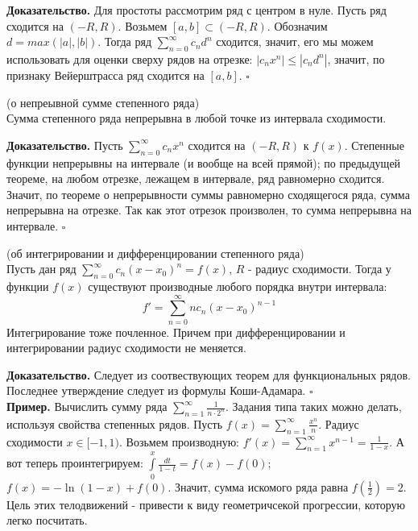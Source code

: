 \textbf{Доказательство.} Для простоты рассмотрим ряд с центром в нуле. 
Пусть ряд сходится на $(-R,R)$. Возьмем  $[a,b]\subset (-R,R)$. Обозначим
$d=max(|a|,|b|)$. Тогда ряд  $\sum\limits_{n=0}^{\infty} c_nd^n$ сходится,
значит, его мы можем использовать для оценки сверху рядов на отрезке:
$|c_nx^n|\leqslant |c_nd^n|$, значит, по признаку Вейерштрасса ряд сходится
на $[a,b]$.
$\square$ 
\begin{theor}
    (о непреывной сумме степенного ряда)\\
    Сумма степенного ряда непрерывна в любой точке из интервала сходимости.
\end{theor}
\textbf{Доказательство.}  Пусть $\sum\limits_{n=0}^{\infty}c_nx^n$ 
сходится на $(-R,R)$ к  $f(x)$. Степенные функции непрерывны на интервале
(и вообще на всей прямой); по предыдущей теореме, на любом отрезке,
лежащем в интервале, ряд равномерно сходится. Значит, по теореме о 
непрерывности суммы равномерно сходящегося ряда, сумма непрерывна на 
отрезке. Так как этот отрезок произволен, то сумма непрерывна на интервале.
$\square$ 
\begin{theor}
    (об интегрировании и дифференцировании степенного ряда)\\
Пусть дан ряд $\sum\limits_{n=0}^{\infty} c_n(x-x_0)^n=f(x)$, $R$ - радиус 
сходимости. Тогда у функции  $f(x)$ существуют производные любого порядка
внутри интервала:
$$f'=\sum\limits_{n=0}^{\infty} nc_n(x-x_0)^{n-1}$$ 
Интегрирование тоже почленное. 
Причем при дифференцировании и интегрировании радиус сходимости не меняется.
\end{theor}
\textbf{Доказательство.}  Следует из соотвествующих теорем для функциональных
рядов. Последнее утверждение следует из формулы Коши-Адамара. 
$\square$\\ 
\textbf{Пример.} Вычислить сумму ряда $\sum\limits_{n=1}^{\infty} 
\frac{1}{n\cdot 2^n}$. Задания типа таких можно делать, используя 
свойства степенных рядов. Пусть $f(x)=\sum\limits_{n=1}^{\infty}\frac{x^n}{n}$.
Радиус сходимости $x\in[-1,1)$. Возьмем производную:
$f'(x)=\sum\limits_{n=1}^{\infty} x^{n-1}=\frac{1}{1-x}$. А вот теперь
проинтегрируем: $\int\limits^x_0\frac{dt}{1-t}=f(x)-f(0)$;
$f(x)=-\ln(1-x)+f(0)$. Значит, сумма искомого ряда равна $f(\frac{1}{2})=2$.
Цель этих телодвижений - привести к виду геометричсекой прогрессии, которую
легко посчитать. 








